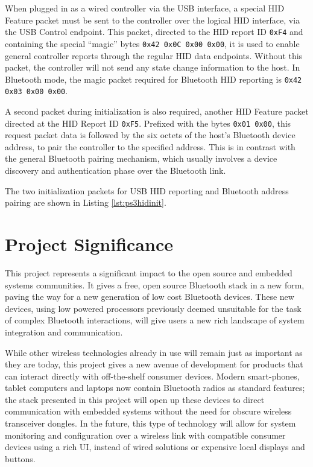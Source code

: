 When plugged in as a wired controller via the USB interface, a special HID Feature packet must be sent to the controller over the logical HID interface, via the USB Control endpoint. This packet, directed to the HID report ID \texttt{0xF4} and containing the special ``magic'' bytes \texttt{0x42 0x0C 0x00 0x00}, it is used to enable general controller reports through the regular HID data endpoints. Without this packet, the controller will not send any state change information to the host. In Bluetooth mode, the magic packet required for Bluetooth HID reporting is \texttt{0x42 0x03 0x00 0x00}.

A second packet during initialization is also required, another HID Feature packet directed at the HID Report ID \texttt{0xF5}. Prefixed with the bytes \texttt{0x01 0x00}, this request packet data is followed by the six octets of the host's Bluetooth device address, to pair the controller to the specified address. This is in contrast with the general Bluetooth pairing mechanism, which usually involves a device discovery and authentication phase over the Bluetooth link.

The two initialization packets for USB HID reporting and Bluetooth address pairing are shown in Listing \ref{lst:ps3hidinit}.



\section{Project Significance}

This project represents a significant impact to the open source and embedded systems communities. It gives a free, open source Bluetooth stack in a new form, paving the way for a new generation of low cost Bluetooth devices. These new devices, using low powered processors previously deemed unsuitable for the task of complex Bluetooth interactions, will give users a new rich landscape of system integration and communication.

While other wireless technologies already in use will remain just as important as they are today, this project gives a new avenue of development for products that can interact directly with off-the-shelf consumer devices. Modern smart-phones, tablet computers and laptops now contain Bluetooth radios as standard features; the stack presented in this project will open up these devices to direct communication with embedded systems without the need for obscure wireless transceiver dongles. In the future, this type of technology will allow for system monitoring and configuration over a wireless link with compatible consumer devices using a rich UI, instead of wired solutions or expensive local displays and buttons.